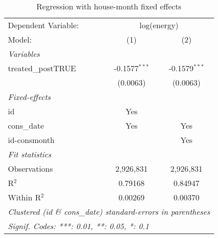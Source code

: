 
\begin{table}[htbp]
   \caption{Regression with house-month fixed effects\label{tab:hm}}
   \centering
   \begin{tabular}{lcc}
      \tabularnewline \midrule \midrule
      Dependent Variable: & \multicolumn{2}{c}{log(energy)}\\
      Model:             & (1)             & (2)\\  
      \midrule
      \emph{Variables}\\
      treated\_postTRUE  & -0.1577$^{***}$ & -0.1579$^{***}$\\   
                         & (0.0063)        & (0.0063)\\   
      \midrule
      \emph{Fixed-effects}\\
      id                 & Yes             & \\  
      cons\_date         & Yes             & Yes\\  
      id-consmonth       &                 & Yes\\  
      \midrule
      \emph{Fit statistics}\\
      Observations       & 2,926,831       & 2,926,831\\  
      R$^2$              & 0.79168         & 0.84947\\  
      Within R$^2$       & 0.00269         & 0.00370\\  
      \midrule \midrule
      \multicolumn{3}{l}{\emph{Clustered (id \& cons\_date) standard-errors in parentheses}}\\
      \multicolumn{3}{l}{\emph{Signif. Codes: ***: 0.01, **: 0.05, *: 0.1}}\\
   \end{tabular}
\end{table}


